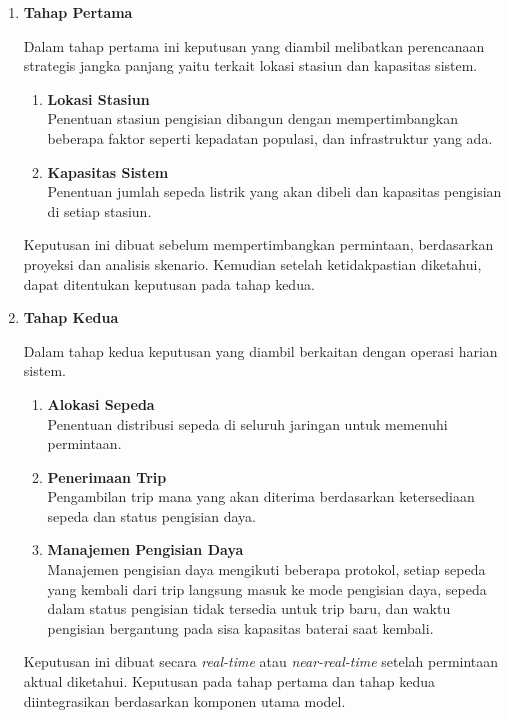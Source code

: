 \begin{enumerate}
    \item \textbf{Tahap Pertama}
    
    Dalam tahap pertama ini keputusan yang diambil  melibatkan perencanaan strategis jangka panjang yaitu terkait lokasi stasiun dan kapasitas sistem.
    \begin{enumerate}
        \item [\textbf{a.}] \textbf{Lokasi Stasiun}\\ Penentuan stasiun pengisian dibangun dengan mempertimbangkan beberapa faktor seperti kepadatan populasi, dan infrastruktur yang ada.
        \item [\textbf{b.}] \textbf{Kapasitas Sistem}\\ Penentuan jumlah sepeda listrik yang akan dibeli dan kapasitas pengisian di setiap stasiun.
    \end{enumerate}
Keputusan ini dibuat sebelum mempertimbangkan permintaan, berdasarkan proyeksi dan analisis skenario. Kemudian setelah ketidakpastian diketahui, dapat ditentukan keputusan pada tahap kedua.

 \item \textbf{Tahap Kedua}
 
    Dalam tahap kedua keputusan yang diambil berkaitan dengan operasi harian sistem.
    \begin{enumerate}
    \item [\textbf{a.}] \textbf{Alokasi Sepeda}\\ Penentuan distribusi sepeda di seluruh jaringan untuk memenuhi permintaan.
    \item [\textbf{b.}] \textbf{Penerimaan Trip}\\ Pengambilan trip mana yang akan diterima berdasarkan ketersediaan sepeda dan status pengisian daya.
    \item [\textbf{c.}] \textbf{Manajemen Pengisian Daya}\\ 
    Manajemen pengisian daya mengikuti beberapa protokol, setiap sepeda yang kembali dari trip langsung masuk ke mode pengisian daya, sepeda dalam status pengisian tidak tersedia untuk trip baru, dan waktu pengisian bergantung pada sisa kapasitas baterai saat kembali.
    \end{enumerate}

Keputusan ini dibuat secara \textit{real-time} atau \textit{near-real-time} setelah permintaan aktual diketahui. Keputusan pada tahap pertama dan tahap kedua diintegrasikan berdasarkan komponen utama model.
\end{enumerate}


